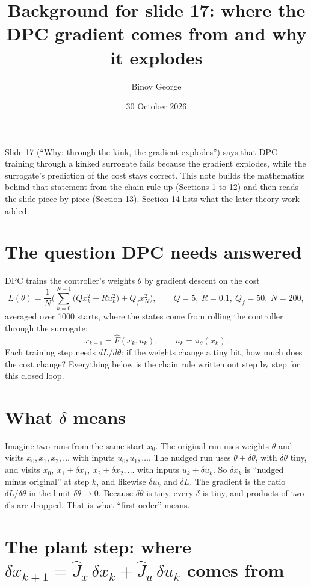 \documentclass[11pt]{article}
\title{Background for slide 17: where the DPC gradient comes from and why it explodes}
\author{Binoy George}
\date{30 October 2026}
\begin{document}
\maketitle

Slide 17 (``Why: through the kink, the gradient explodes'') says that DPC training through a kinked surrogate fails because the gradient explodes, while the surrogate's prediction of the cost stays correct. This note builds the mathematics behind that statement from the chain rule up (Sections 1 to 12) and then reads the slide piece by piece (Section 13). Section 14 lists what the later theory work added.

\section{The question DPC needs answered}

DPC trains the controller's weights $\theta$ by gradient descent on the cost
\begin{equation}
L(\theta)=\frac1N\Big(\sum_{k=0}^{N-1}\big(Q x_k^2+R u_k^2\big)+Q_f x_N^2\Big),\qquad Q=5,\ R=0.1,\ Q_f=50,\ N=200,
\end{equation}
averaged over 1000 starts, where the states come from rolling the controller through the surrogate:
\begin{equation}
x_{k+1}=\hat F(x_k,u_k),\qquad u_k=\pi_\theta(x_k).
\end{equation}
Each training step needs $dL/d\theta$: if the weights change a tiny bit, how much does the cost change? Everything below is the chain rule written out step by step for this closed loop.

\section{What $\delta$ means}

Imagine two runs from the same start $x_0$. The original run uses weights $\theta$ and visits $x_0,x_1,x_2,\dots$ with inputs $u_0,u_1,\dots$. The nudged run uses $\theta+\delta\theta$, with $\delta\theta$ tiny, and visits $x_0,\ x_1+\delta x_1,\ x_2+\delta x_2,\dots$ with inputs $u_k+\delta u_k$. So $\delta x_k$ is ``nudged minus original'' at step $k$, and likewise $\delta u_k$ and $\delta L$. The gradient is the ratio $\delta L/\delta\theta$ in the limit $\delta\theta\to0$. Because $\delta\theta$ is tiny, every $\delta$ is tiny, and products of two $\delta$'s are dropped. That is what ``first order'' means.

\section{The plant step: where $\delta x_{k+1}=\hat J_x\,\delta x_k+\hat J_u\,\delta u_k$ comes from}
\end{document}
